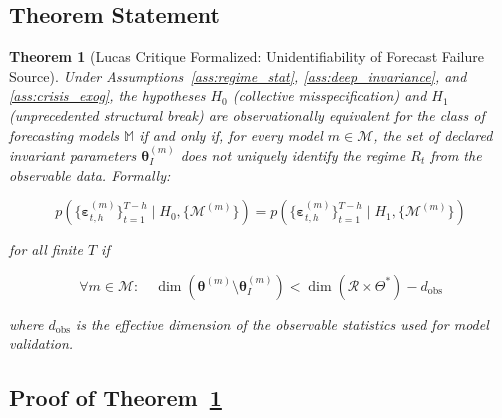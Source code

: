 \documentclass[12pt,a4paper]{article}
\newtheorem{theorem}{Theorem}[section]
\begin{document}
\subsection{Theorem Statement}

\begin{theorem}[Lucas Critique Formalized: Unidentifiability of Forecast
Failure Source]
\label{thm:lucas_unident}
Under Assumptions~\ref{ass:regime_stat}, \ref{ass:deep_invariance},
and \ref{ass:crisis_exog}, the hypotheses $H_0$ (collective
misspecification) and $H_1$ (unprecedented structural break) are
\emph{observationally equivalent} for the class of forecasting models
$\mathbb{M}$ if and only if, for every model $m \in \mathcal{M}$,
the set of declared invariant parameters $\boldsymbol{\theta}^{(m)}_I$
does not uniquely identify the regime $R_t$ from the observable data.
Formally:

\begin{equation}
    p\left(\{\boldsymbol{\varepsilon}_{t,h}^{(m)}\}_{t=1}^{T-h} \mid H_0,
    \{\mathcal{M}^{(m)}\}\right) =
    p\left(\{\boldsymbol{\varepsilon}_{t,h}^{(m)}\}_{t=1}^{T-h} \mid H_1,
    \{\mathcal{M}^{(m)}\}\right)
    \label{eq:obs_equiv_main}
\end{equation}

for all finite $T$ if

\begin{equation}
    \forall m \in \mathcal{M}: \quad
    \dim\left(\boldsymbol{\theta}^{(m)} \setminus
    \boldsymbol{\theta}^{(m)}_I\right) <
    \dim\left(\mathcal{R} \times \Theta^*\right) - d_{\text{obs}}
    \label{eq:dim_condition}
\end{equation}

where $d_{\text{obs}}$ is the effective dimension of the observable
statistics used for model validation.
\end{theorem}

\subsection{Proof of Theorem~\ref{thm:lucas_unident}}
\end{document}
